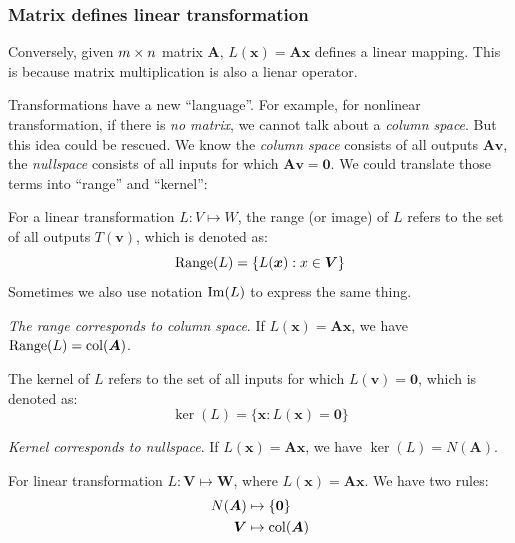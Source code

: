 \subsubsection{Matrix defines linear transformation}
Conversely, given $m\times n$ matrix $\bm A$, $L(\bm x) = \bm{Ax}$ defines a linear mapping. This is because matrix multiplication is also a lienar operator.\\
\begin{remark}
Transformations have a new ``language''. For example, for nonlinear transformation, if there is \emph{no matrix}, we cannot talk about a \emph{column space}. But this idea could be rescued. We know the \textit{column space} consists of all outputs $\bm{Av}$, the \textit{nullspace} consists of all inputs for which $\bm{Av}=\bm 0$. We could translate those terms into ``range'' and ``kernel'':
\end{remark}
\begin{definition}[range]
For a linear transformation $L:V\mapsto W$, the range (or image) of $L$ refers to the set of all outputs $T(\bm v)$, which is denoted as:
\[
\operatorname{Range}(L)=\{L(\bm x):x\in\bm V\}
\]
Sometimes we also use notation $\operatorname{Im}(L)$ to express the same thing.
\end{definition}
\emph{The range corresponds to column space}. If $L(\bm x)=\bm{Ax}$, we have $\operatorname{Range}(L)=\operatorname{col}(\bm A)$.
\begin{definition}[kernel]
The kernel of $L$ refers to the set of all inputs for which $L(\bm v)=\bm 0$, which is denoted as:
\[
\ker(L)=\{\bm x:L(\bm x)=\bm 0\}
\]
\end{definition}
\emph{Kernel corresponds to nullspace}. If $L(\bm x)=\bm{Ax}$, we have $\ker(L)=N(\bm A)$.
\begin{remark}
For linear transformation $L:\bm V\mapsto \bm W$, where $L(\bm x)=\bm{Ax}$. We have two rules:
\[
\begin{aligned}
N(\bm A)&\mapsto \{\bm 0\}\\
\bm V&\mapsto \operatorname{col}(\bm A)
\end{aligned}
\]
\end{remark}
